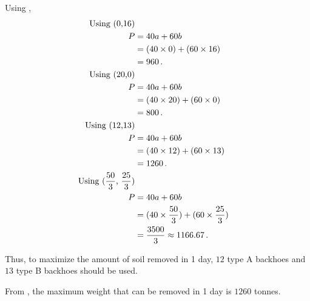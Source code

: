 \begin{subquestions}
\begin{subsubquestions}
Using ,
\begin{align}
	\text{Using (0,16)}  \nonumber \\
	P & = 40a + 60b  \nonumber \\
	  & = (40 \times 0) + (60 \times 16) \nonumber \\
	  & = 960 \,. \\
	\text{Using (20,0)}  \nonumber \\
	P & = 40a + 60b  \nonumber \\
      & = (40 \times 20) + (60 \times 0)  \nonumber \\
	  & = 800 \,. \\		  
	\text{Using (12,13)}  \nonumber \\
	P & = 40a + 60b  \nonumber \\
	  & = (40 \times 12) + (60 \times 13)  \nonumber \\
	  & = 1260 \,. \label{2012:q1:eqn:Profit} \\
	\text{Using ($\frac{50}{3}$, $\frac{25}{3}$)}  \nonumber \\
	P & = 40a + 60b  \nonumber \\
	  & = (40 \times \frac{50}{3}) + (60 \times \frac{25}{3})  \nonumber \\
	  & = \frac{3500}{3} \approx 1166.67 \,. 
\end{align}

Thus, to maximize the amount of soil removed in 1 day, $12$ type A backhoes and $13$ type B backhoes should be used.


\subsubquestion

From , the maximum weight that can be removed in 1 day is $1260$ tonnes.

\end{subsubquestions}

\end{subquestions}

